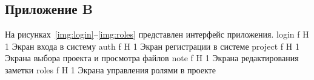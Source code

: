 \begin{appendices}
	\chapter{Приложение B}
	На рисунках~\ref{img:login}--\ref{img:roles} представлен интерфейс приложения.
		{login}
		{f}
		{H}
		{1\textwidth}
		{Экран входа в систему}
		{auth}
		{f}
		{H}
		{1\textwidth}
		{Экран регистрации в системе}
		{project}
		{f}
		{H}
		{1\textwidth}
		{Экрана выбора проекта и просмотра файлов}
		{note}
		{f}
		{H}
		{1\textwidth}
		{Экрана редактирования заметки}
		{roles}
		{f}
		{H}
		{1\textwidth}
		{Экрана управления ролями в проекте}
\end{appendices}